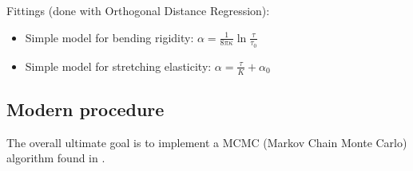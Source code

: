 Fittings (done with Orthogonal Distance Regression):
\begin{itemize}
	\item Simple model for bending rigidity: $\alpha=\frac{1}{8\pi\kappa}\ln{\frac{\tau}{\tau_0}}$
	\item Simple model for stretching elasticity: $\alpha=\frac{\tau}{K}+\alpha_0$
\end{itemize}

\subsection{Modern procedure}
The overall ultimate goal is to implement a MCMC (Markov Chain Monte Carlo) algorithm found in  \cite{Henriksen2004}.